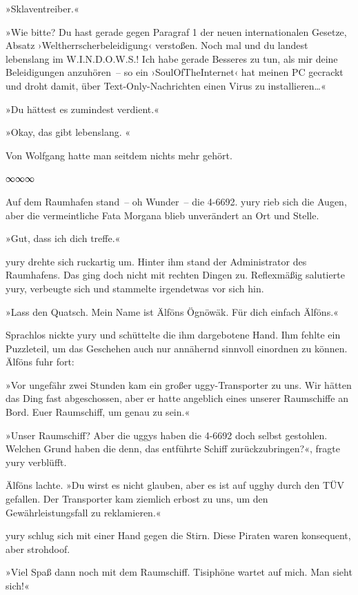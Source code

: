 »Sklaventreiber.«

»Wie bitte? Du hast gerade gegen Paragraf 1 der neuen internationalen Gesetze, Absatz ›Weltherrscherbeleidigung‹ verstoßen. Noch mal und du landest lebenslang im W.I.N.D.O.W.S.! Ich habe gerade Besseres zu tun, als mir deine Beleidigungen anzuhören~– so ein ›SoulOfTheInternet‹ hat meinen PC gecrackt und droht damit, über Text-Only-Nachrichten einen Virus zu installieren…«

»Du hättest es zumindest verdient.«

»Okay, das gibt lebenslang. «

Von Wolfgang hatte man seitdem nichts mehr gehört.

\begin{center}
    ∞∞∞
\end{center}

Auf dem Raumhafen stand~– oh Wunder~– die 4-6692. yury rieb sich die Augen, aber die vermeintliche Fata Morgana blieb unverändert an Ort und Stelle.

»Gut, dass ich dich treffe.«

yury drehte sich ruckartig um. Hinter ihm stand der Administrator des Raumhafens. Das ging doch nicht mit rechten Dingen zu. Reflexmäßig salutierte yury, verbeugte sich und stammelte irgendetwas vor sich hin.

»Lass den Quatsch. Mein Name ist Älföns Ögnöwäk. Für dich einfach Älföns.«

Sprachlos nickte yury und schüttelte die ihm dargebotene Hand. Ihm fehlte ein Puzzleteil, um das Geschehen auch nur annähernd sinnvoll einordnen zu können. Älföns fuhr fort:

»Vor ungefähr zwei Stunden kam ein großer uggy-Transporter zu uns. Wir hätten das Ding fast abgeschossen, aber er hatte angeblich eines unserer Raumschiffe an Bord. Euer Raumschiff, um genau zu sein.«

»Unser Raumschiff? Aber die uggys haben die 4-6692 doch selbst gestohlen. Welchen Grund haben die denn, das entführte Schiff zurückzubringen?«, fragte yury verblüfft.

Älföns lachte. »Du wirst es nicht glauben, aber es ist auf ugghy durch den TÜV gefallen. Der Transporter kam ziemlich erbost zu uns, um den Gewährleistungsfall zu reklamieren.«

yury schlug sich mit einer Hand gegen die Stirn. Diese Piraten waren konsequent, aber strohdoof.

»Viel Spaß dann noch mit dem Raumschiff. Tisiphöne wartet auf mich. Man sieht sich!«

